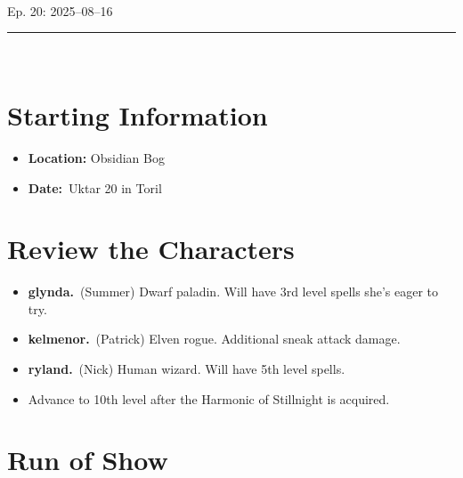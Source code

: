 \documentclass[10pt,twocolumn]{article}
\renewcommand{\textsc}[1]{\XCharterSC#1}
\let\oldtextbf\textbf
\renewcommand{\textbf}[1]{\oldtextbf{{#1}}}
\providecommand{\tightlist}{
  \setlength{\itemsep}{4pt}
  \setlength{\topsep}{0pt}
  \setlength{\parsep}{0pt}
  \setlength{\parskip}{0pt}
  \setlength{\partopsep}{0pt}
}
\begin{document}
\begingroup
\makeatletter
\setlength{\@fptop}{0pt}
\vspace*{-\topskip}
\makeatother
\endgroup
\vspace*{-\topskip}

\begingroup
\begin{center}
\fontsize{36pt}{36pt}\color{highlightcolor}\selectfont
{}
\\
\LARGE\color{sectioncolor}\headerfontbold
Ep. 20: 2025–08–16\\[-18pt]
\color{sectioncolor}\rule{\linewidth}{2pt}
\\[-2pt]
\end{center}
\endgroup

\section{Starting Information}\label{starting-information}

\begin{itemize}
\tightlist
\item
  \textbf{Location:} Obsidian Bog
\item
  \textbf{Date:}~Uktar 20 in Toril
\end{itemize}

\section{Review the Characters}\label{review-the-characters}

\begin{itemize}
\tightlist
\item
  \textbf{\textcolor{keywordcolor}{\textbf{\textsc{glynda}}}.}~(Summer)
  Dwarf paladin. Will have 3rd level spells she's eager to try.~
\item
  \textbf{\textcolor{keywordcolor}{\textbf{\textsc{kelmenor}}}.}~(Patrick)
  Elven rogue. Additional sneak attack damage.~
\item
  \textbf{\textcolor{keywordcolor}{\textbf{\textsc{ryland}}}.}~(Nick)
  Human wizard. Will have 5th level spells.~
\item
  Advance to 10th level after the Harmonic of Stillnight is acquired.
\end{itemize}

\section{Run of Show}\label{run-of-show}
\end{document}
